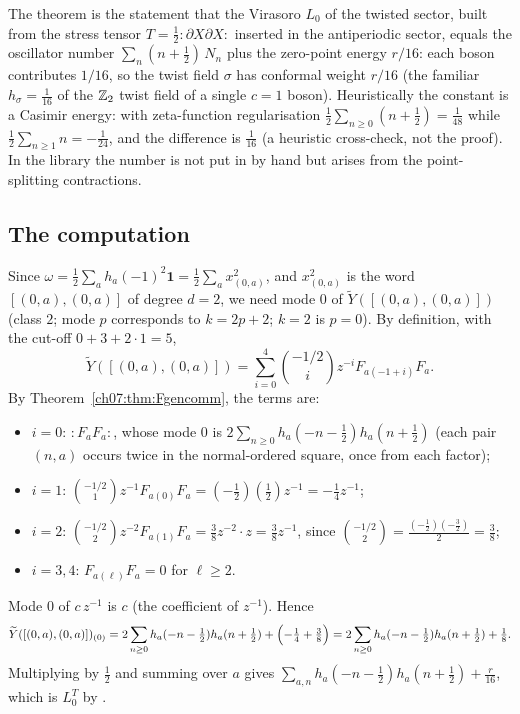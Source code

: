 \begin{physics}
The theorem is the statement that the Virasoro $L_0$ of the twisted sector, built from the stress tensor $T=\tfrac12{:}\partial X\partial X{:}$ inserted in the antiperiodic sector, equals the oscillator number $\sum_n(n+\tfrac12)\,N_n$ plus the zero-point energy $r/16$: each boson contributes $1/16$, so the twist field $\sigma$ has conformal weight $r/16$ (the familiar $h_\sigma=\tfrac1{16}$ of the ${\mathbb{Z}}_2$ twist field of a single $c=1$ boson). Heuristically the constant is a Casimir energy: with zeta-function regularisation $\tfrac12\sum_{n\ge0}(n+\tfrac12)=\tfrac1{48}$ while $\tfrac12\sum_{n\ge1}n=-\tfrac1{24}$, and the difference is $\tfrac1{16}$ (a heuristic cross-check, not the proof). In the library the number is not put in by hand but arises from the point-splitting contractions.
\end{physics}

\subsection{The computation}

Since $\omega = \frac12\sum_a h_a(-1)^2\mathbf 1 = \frac12\sum_a x_{(0,a)}^2$, and $x_{(0,a)}^2$ is
the word $[(0,a),(0,a)]$ of degree $d=2$, we need mode $0$ of
$\widetilde Y([(0,a),(0,a)])$ (class $2$; mode $p$ corresponds to $k = 2p+2$; $k=2$ is $p=0$).
By definition, with the cut-off $0+3+2\cdot1 = 5$,
\begin{equation*}
  \widetilde Y([(0,a),(0,a)]) = \sum_{i=0}^{4}\binom{-1/2}{i}z^{-i}F_{a(-1+i)}F_a .
\end{equation*}
By Theorem~\ref{ch07:thm:Fgencomm}, the terms are:
\begin{itemize}
  \item $i=0$: ${:}F_aF_a{:}$, whose mode $0$ is $2\sum_{n\ge0}h_a(-n-\frac12)h_a(n+\frac12)$
  (each pair $(n,a)$ occurs twice in the normal-ordered square, once from each factor);
  \item $i=1$: $\binom{-1/2}{1}z^{-1}F_{a(0)}F_a = (-\tfrac12)(\tfrac12)z^{-1} = -\tfrac14
  z^{-1}$;
  \item $i=2$: $\binom{-1/2}{2}z^{-2}F_{a(1)}F_a = \tfrac38 z^{-2}\cdot z = \tfrac38z^{-1}$,
  since $\binom{-1/2}{2} = \frac{(-\frac12)(-\frac32)}{2} = \frac38$;
  \item $i=3,4$: $F_{a(\ell)}F_a=0$ for $\ell\ge2$.
\end{itemize}
Mode $0$ of $c\,z^{-1}$ is $c$ (the coefficient of $z^{-1}$). Hence
\begin{equation}\label{ch07:eq:oneeighth}
  \widetilde Y([(0,a),(0,a)])_{(0)} = 2\sum_{n\ge0}h_a(-n-\tfrac12)h_a(n+\tfrac12) +
  \Bigl(-\tfrac14+\tfrac38\Bigr) = 2\sum_{n\ge0}h_a(-n-\tfrac12)h_a(n+\tfrac12)+\tfrac18.
\end{equation}
Multiplying by $\frac12$ and summing over $a$ gives
$\sum_{a,n}h_a(-n-\frac12)h_a(n+\frac12) + \frac r{16}$, which is $L_0^T$ by
.


